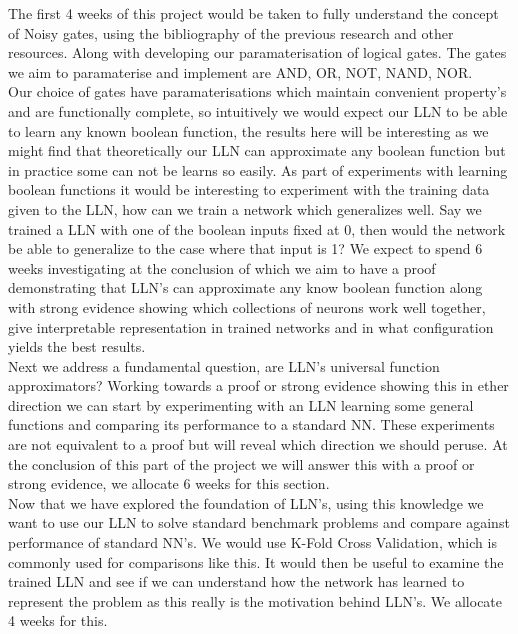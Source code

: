 \documentclass[11pt, a4paper, twoside, openright]{report}
\begin{document}
The first 4 weeks of this project would be taken to fully understand the concept of Noisy gates, using the bibliography of the previous research and other resources. Along with developing our paramaterisation of logical gates. The gates we aim to paramaterise and implement are AND, OR, NOT, NAND, NOR. \\

Our choice of gates have paramaterisations which maintain convenient property's and are functionally complete, so intuitively we would expect our LLN to be able to learn any known boolean function, the results here will be interesting as we might find that theoretically our LLN can approximate any boolean function but in practice some can not be learns so easily. As part of experiments with learning boolean functions it would be interesting to experiment with the training data given to the LLN, how can we train a network which generalizes well. Say we trained a LLN with one of the boolean inputs fixed at 0, then would the network be able to generalize to the case where that input is 1? We expect to spend 6 weeks investigating at the conclusion of which we aim to have a proof demonstrating that LLN's can approximate any know boolean function along with strong evidence showing which collections of neurons work well together, give interpretable representation in trained networks and in what configuration yields the best results. \\

Next we address a fundamental question, are LLN's universal function approximators? Working towards a proof or strong evidence showing this in ether direction we can start by experimenting with an LLN learning some general functions and comparing its performance to a standard NN. These experiments are not equivalent to a proof but will reveal which direction we should peruse. At the conclusion of this part of the project we will answer this with a proof or strong evidence, we allocate 6 weeks for this section. \\

Now that we have explored the foundation of LLN's, using this knowledge we want to use our LLN to solve standard benchmark problems and compare against performance of standard NN's. We would use K-Fold Cross Validation, which is commonly used for comparisons like this. It would then be useful to examine the trained LLN and see if we can understand how the network has learned to represent the problem as this really is the motivation behind LLN's. We allocate 4 weeks for this. \\
\end{document}
